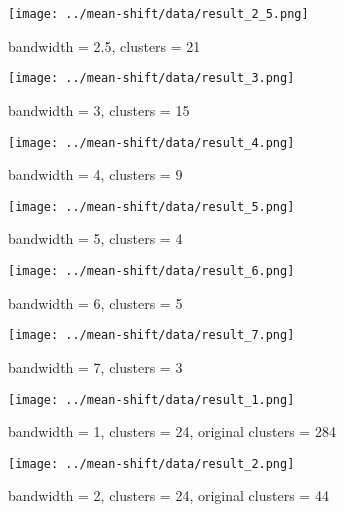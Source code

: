 \documentclass{ETHExercise}
\begin{document}
\begin{figure}[!h]
    \texttt{[image: ../mean-shift/data/result\_2\_5.png]}
  \caption{bandwidth = 2.5, clusters = 21}
  \endminipage\space
    \texttt{[image: ../mean-shift/data/result\_3.png]}
    \caption{bandwidth = 3, clusters = 15}
  \endminipage\space
    \texttt{[image: ../mean-shift/data/result\_4.png]}
    \caption{bandwidth = 4, clusters = 9}
  \endminipage\space
    \texttt{[image: ../mean-shift/data/result\_5.png]}
    \caption{bandwidth = 5, clusters = 4}
  \endminipage\hfill
    \texttt{[image: ../mean-shift/data/result\_6.png]}
    \caption{bandwidth = 6, clusters = 5}
  \endminipage\hfill
    \texttt{[image: ../mean-shift/data/result\_7.png]}
    \caption{bandwidth = 7, clusters = 3}
  \endminipage\hfill
    \texttt{[image: ../mean-shift/data/result\_1.png]}
    \caption{bandwidth = 1, clusters = 24, original clusters = 284}
  \endminipage\hfill
    \texttt{[image: ../mean-shift/data/result\_2.png]}
    \caption{bandwidth = 2, clusters = 24, original clusters = 44}
  \endminipage
  \end{figure}
\end{document}
